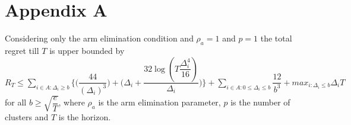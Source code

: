 



\section{Appendix A}
\begin{proposition}
Considering only the arm elimination condition and $\rho_{a}=1$ and $p=1$ the total regret till $T$ is upper bounded by $R_{T}\leq \sum_{i\in A:\Delta_{i}\geq b}\bigg \lbrace \bigg(\dfrac{44}{(\Delta_{i})^{3}}\bigg) + \bigg(\Delta_{i}+\dfrac{32\log{(T\dfrac{\Delta_{i}^{4}}{16})}}{\Delta_{i}}\bigg)\bigg\rbrace + \sum_{i\in A:0\leq\Delta_{i}\leq b}\dfrac{12}{b^{3}} + max_{i:\Delta_{i}\leq b}\Delta_{i}T$ for all $b\geq\sqrt{\dfrac{e}{T}}$, where $\rho_{a}$ is the arm elimination parameter, $p$ is the number of clusters and $T$ is the horizon.
\end{proposition}

